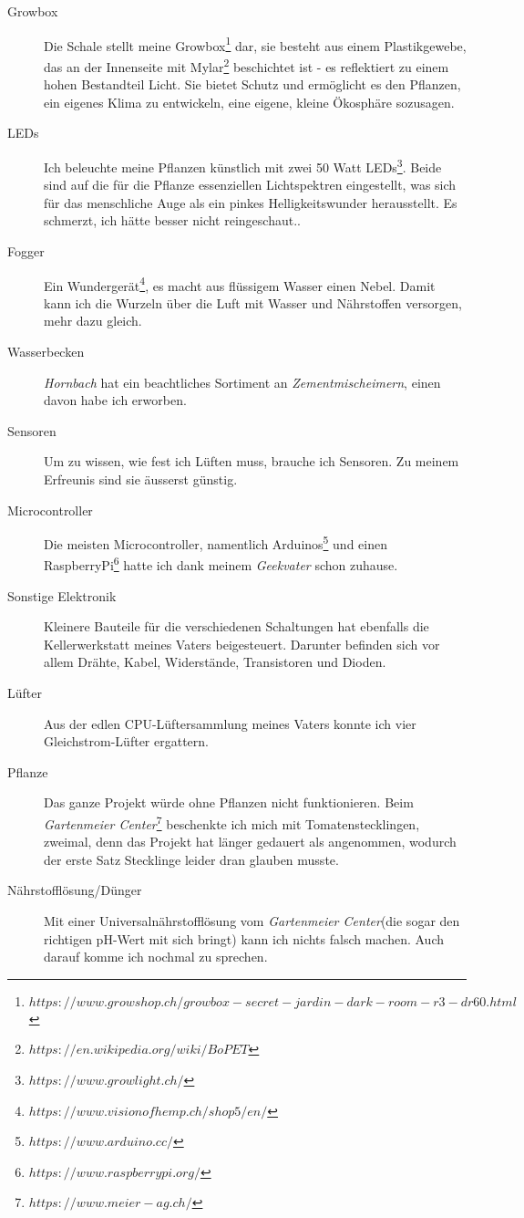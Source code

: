 \documentclass[12pt,titlepage,a4paper]{article}
\begin{document}
\begin{description}
\item[Growbox] Die Schale stellt meine Growbox\footnote{$https://www.growshop.ch/growbox-secret-jardin-dark-room-r3-dr60.html$} dar, sie besteht aus einem Plastikgewebe, das an der Innenseite mit Mylar\footnote{$https://en.wikipedia.org/wiki/BoPET$} beschichtet ist - es reflektiert zu einem hohen Bestandteil Licht. Sie bietet Schutz und ermöglicht es den Pflanzen, ein eigenes Klima zu entwickeln, eine eigene, kleine Ökosphäre sozusagen.
\item[LEDs] Ich beleuchte meine Pflanzen künstlich mit zwei 50 Watt LEDs\footnote{$https://www.growlight.ch/$}. Beide sind auf die für die Pflanze essenziellen Lichtspektren eingestellt, was sich für das menschliche Auge als ein pinkes Helligkeitswunder herausstellt. Es schmerzt, ich hätte besser nicht reingeschaut..
\item[Fogger] Ein Wundergerät\footnote{$https://www.visionofhemp.ch/shop5/en/$}, es macht aus flüssigem Wasser einen Nebel. Damit kann ich die Wurzeln über die Luft mit Wasser und Nährstoffen versorgen, mehr dazu gleich.
\item[Wasserbecken] \textit{Hornbach} hat ein beachtliches Sortiment an \textit{Zementmischeimern}, einen davon habe ich erworben.
\item[Sensoren] Um zu wissen, wie fest ich Lüften muss, brauche ich Sensoren. Zu meinem Erfreunis sind sie äusserst günstig.
\item[Microcontroller] Die meisten Microcontroller, namentlich Arduinos\footnote{$https://www.arduino.cc/$} und einen RaspberryPi\footnote{$https://www.raspberrypi.org/$} hatte ich dank meinem \textit{Geekvater} schon zuhause.
\item[Sonstige Elektronik] Kleinere Bauteile für die verschiedenen Schaltungen hat ebenfalls die Kellerwerkstatt meines Vaters beigesteuert. Darunter befinden sich vor allem Drähte, Kabel, Widerstände, Transistoren und Dioden.
\item[Lüfter] Aus der edlen CPU-Lüftersammlung meines Vaters konnte ich vier Gleichstrom-Lüfter ergattern.
\item[Pflanze] Das ganze Projekt würde ohne Pflanzen nicht funktionieren. Beim \textit{Gartenmeier Center}\footnote{$https://www.meier-ag.ch/$} beschenkte ich mich mit Tomatenstecklingen, zweimal, denn das Projekt hat länger gedauert als angenommen, wodurch der erste Satz Stecklinge leider dran glauben musste.
\item[Nährstofflösung/Dünger] Mit einer Universalnährstofflösung vom \textit{Gartenmeier Center}(die sogar den richtigen pH-Wert mit sich bringt) kann ich nichts falsch machen. Auch darauf komme ich nochmal zu sprechen.
\end{description}
\end{document}
